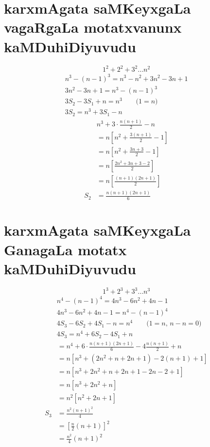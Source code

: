 \section*{\;karxmAgata saMKeyxgaLa vagaRgaLa motatxvanunx kaMDuhiDiyuvudu}
$$
1^2+2^2+3^2\ldots n^2
$$
\begin{gather*}
n^3 -(n-1)^3 = n^3 - n^2+3n^2 - 3n+1\\
3n^2-3n+1 = n^3-(n-1)^3\\
3S_{2}-3S_{1} +n = n^3 \qquad\text{($1=n$)}\\
3S_{2} = n^3+ 3S_{1}-n
\end{gather*}
\begin{align*}
&n^3 + 3 \cdot \frac{n(n+1)}{2} -n\\
&=n\left[n^2+\frac {3(n+1)}{2}-1\right]\\
&=n \left[n^2+\frac{3n+3}{2}-1\right]\\
&=n\left[\frac{2n^2 + 3n + 3 - 2}{2}\right]\\
&=n\left[\frac{(n+1)(2n+1)}{2}\right]\\
S_2 &=\frac{n(n+1)(2n+1)}{6}
\end{align*}

\section*{\;karxmAgata saMKeyxgaLa GanagaLa motatx kaMDuhiDiyuvudu}
$$
1^3+2^3+3^3\ldots n^3
$$
\begin{align*}
&n^4 - (n-1)^4 = 4n^3 - 6n^2 +4n -1\\
&4n^{3}-6n^2 + 4n -1 = n^4 - (n-1)^4\\
&4S_{3}-6S_{2} +4S_{1}-n = n^4 \qquad\text{($1=n$, $n-n =0$)}\\
&4S_{3} = n^4 +6S_{2} -4S_{1} +n
\end{align*}
\begin{align*}
&=n^4+6\cdot \frac{n(n+1)(2n+1)}{6} -4 \frac{n(n+1)}{2}+n\\
&=n\left[n^3 + \left(2n^2 + n+2n +1\right) - 2(n+1) +1\right]\\
&=n\left[n^3+2n^2+n+2n+1-2n-2+1\right]\\
&=n\left[n^3+2n^{2}+n\right]\\
&=n^2\left[n^2+2n+1\right]\\
S_3&= \frac{n^2(n+1)^2}{4}\\
&=\left[\frac{n}{2}(n+1)\right]^2\\
&=\frac{n^2}{4}(n+1)^2
\end{align*}

